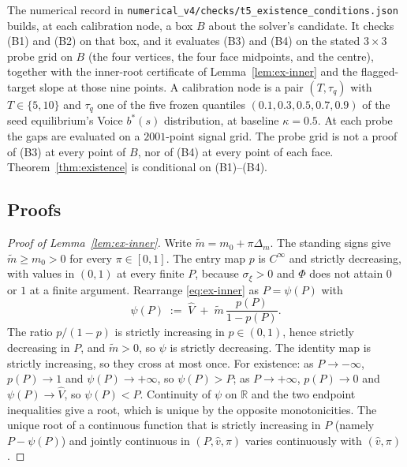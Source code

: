 \begin{remark}
\label{rem:ex-probe}
The numerical record in \texttt{numerical\_v4/checks/t5\_existence\_conditions.json} builds, at each
calibration node, a box $B$ about the solver's candidate. It checks (B1) and (B2) on that box, and
it evaluates (B3) and (B4) on the stated $3\times 3$ probe grid on $B$ (the four vertices, the four
face midpoints, and the centre), together with the inner-root certificate of
Lemma~\ref{lem:ex-inner} and the flagged-target slope at those nine points. A calibration node is a
pair $(T,\tau_q)$ with $T\in\{5,10\}$ and $\tau_q$ one of the five frozen quantiles
$(0.1,0.3,0.5,0.7,0.9)$ of the seed equilibrium's Voice $b^*(s)$ distribution, at baseline
$\kappa=0.5$. At each probe the gaps are evaluated on a $2001$-point signal grid. The probe grid is
not a proof of (B3) at every point of $B$, nor of (B4) at every point of each face.
Theorem~\ref{thm:existence} is conditional on (B1)--(B4).
\end{remark}

\subsection*{Proofs}
\label{sec:pf-existence-proofs}

\begin{proof}[Proof of Lemma~\ref{lem:ex-inner}]
Write $\tilde m=m_0+\pi\Delta_m$. The standing signs give $\tilde m\ge m_0>0$ for every
$\pi\in[0,1]$. The entry map $p$ is $C^\infty$ and strictly decreasing, with values in $(0,1)$ at
every finite $P$, because $\sigma_\xi>0$ and $\Phi$ does not attain $0$ or $1$ at a finite argument.
Rearrange \eqref{eq:ex-inner} as $P=\psi(P)$ with
\[
\psi(P) \;:=\; \hat V \;+\; \tilde m\,\frac{p(P)}{1-p(P)}.
\]
The ratio $p/(1-p)$ is strictly increasing in $p\in(0,1)$, hence strictly decreasing in $P$, and
$\tilde m>0$, so $\psi$ is strictly decreasing. The identity map is strictly increasing, so they
cross at most once. For existence: as $P\to-\infty$, $p(P)\to 1$ and $\psi(P)\to+\infty$, so
$\psi(P)>P$; as $P\to+\infty$, $p(P)\to 0$ and $\psi(P)\to\hat V$, so $\psi(P)<P$. Continuity of
$\psi$ on $\mathbb R$ and the two endpoint inequalities give a root, which is unique by the opposite
monotonicities. The unique root of a continuous function that is strictly increasing in $P$ (namely
$P-\psi(P)$) and jointly continuous in $(P,\hat v,\pi)$ varies continuously with $(\hat v,\pi)$.
\end{proof}


